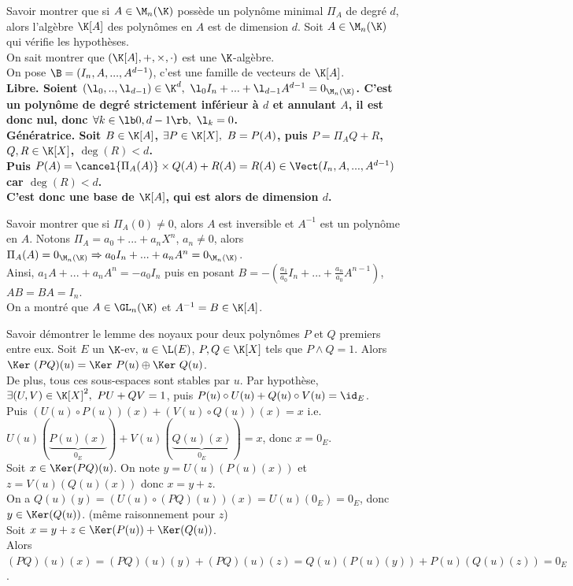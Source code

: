 \documentclass[french, 11pt]{article}
\begin{document}
\begin{exercice}{}{}
    Savoir montrer que si $A\in \M_n(\K)$ possède un polynôme minimal $\Pi_A$ de degré $d$, alors l'algèbre $\K[A]$ des polynômes en $A$ est de dimension $d$.
    \tcblower
    Soit $A \in \M_n(\K)$ qui vérifie les hypothèses.\\
    On sait montrer que $(\K[A],+,\times,\cdot)$ est une $\K$-algèbre.\\
    On pose $\B=(I_n,A,...,A^{d-1})$, c'est une famille de vecteurs de $\K[A]$.\\
    \bf{Libre.} Soient $(\l_0,..,\l_{d-1})\in\K^d, ~ \l_0 I_n+...+\l_{d-1}A^{d-1}=0_{\M_n(\K)}$. C'est un polynôme de degré strictement inférieur à $d$ et annulant $A$, il est donc nul, donc $\forall k \in \lb0,d-1\rb, ~ \l_k=0$.\\
    \bf{Génératrice.} Soit $B\in\K[A]$, $\exists P \in \K[X], ~ B=P(A)$, puis $P=\Pi_AQ + R$, ~ $Q,R\in\K[X]$, $\deg(R)<d$.\\
    Puis $P(A)=\cancel{\Pi_A(A)}\times Q(A) + R(A) = R(A) \in \Vect(I_n,A,...,A^{d-1})$ car $\deg(R)<d$.\\
    C'est donc une base de $\K[A]$, qui est alors de dimension $d$.
\end{exercice}

\begin{exercice}{}{}
    Savoir montrer que si $\Pi_A(0) \ne 0$, alors $A$ est inversible et $A^{-1}$ est un polynôme en $A$.
    \tcblower
    Notons $\Pi_A=a_0+...+a_nX^n$, $a_n\neq0$, alors $\Pi_A(A)=0_{\M_n(\K)} \Rightarrow a_0 I_n+...+a_nA^n=0_{\M_n(\K)}$.\\
    Ainsi, $a_1A + ... + a_nA^n = -a_0 I_n$ puis en posant $B=-\left( \frac{a_1}{a_0}I_n + ... + \frac{a_n}{a_0}A^{n-1} \right)$, $AB = BA = I_n$.\\
    On a montré que $A\in\GL_n(\K)$ et $A^{-1}=B\in\K[A]$.
\end{exercice}

\begin{exercice}{}{}
    Savoir démontrer le lemme des noyaux pour deux polynômes $P$ et $Q$ premiers entre eux.
    \tcblower
    Soit $E$ un $\K$-ev, $u\in\L(E)$, $P,Q\in\K[X]$ tels que $P\land Q=1$. Alors $\Ker~(PQ)(u)=\Ker~P(u) \oplus \Ker~Q(u)$.\\
    De plus, tous ces sous-espaces sont stables par $u$.
    \tcblower
    Par hypothèse, $\exists (U,V)\in\K[X]^2, ~ PU+QV=1$, puis $P(u)\circ U(u)+Q(u)\circ V(u) = \id_E$.\\
    Puis $(U(u)\circ P(u))(x) + (V(u)\circ Q(u))(x)=x$ i.e. $U(u)(\underbrace{P(u)(x)}_{0_E})+V(u)(\underbrace{Q(u)(x)}_{0_E})=x$, donc $x=0_E$.\\
    \boxed{\subset} Soit $x\in \Ker(PQ)(u)$. On note $y=U(u)(P(u)(x))$ et $z=V(u)(Q(u)(x))$ donc $x=y+z$.\\
    On a $Q(u)(y)=(U(u) \circ (PQ)(u))(x) = U(u)(0_E)=0_E$, donc $y\in\Ker(Q(u))$. (même raisonnement pour $z$)\\
    \boxed{\supset} Soit $x=y+z\in\Ker(P(u))+\Ker(Q(u))$.\\
    Alors $(PQ)(u)(x)=(PQ)(u)(y)+(PQ)(u)(z)=Q(u)(P(u)(y))+P(u)(Q(u)(z))=0_E$.
\end{exercice}
\end{document}
